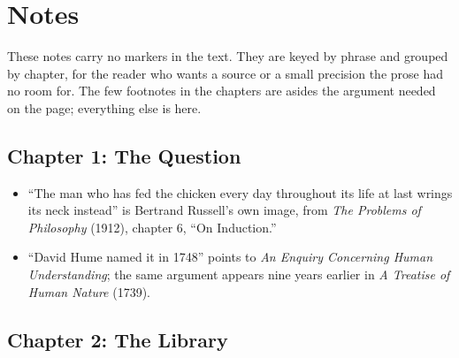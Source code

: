 \chapter*{Notes}

These notes carry no markers in the text. They are keyed by phrase and grouped by chapter, for the reader who wants a source or a small precision the prose had no room for. The few footnotes in the chapters are asides the argument needed on the page; everything else is here.

\section*{Chapter 1: The Question}

\begin{itemize}
\setlength{\itemsep}{0.5em}
\item ``The man who has fed the chicken every day throughout its life at last wrings its neck instead'' is Bertrand Russell's own image, from \textit{The Problems of Philosophy} (1912), chapter 6, ``On Induction.''
\item ``David Hume named it in 1748'' points to \textit{An Enquiry Concerning Human Understanding}; the same argument appears nine years earlier in \textit{A Treatise of Human Nature} (1739).
\end{itemize}

\section*{Chapter 2: The Library}

